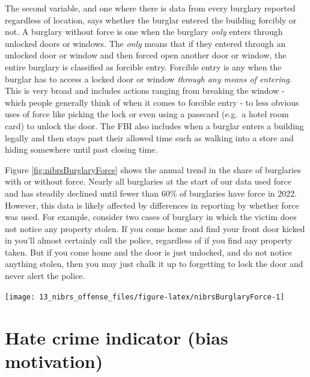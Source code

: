 \documentclass[
]{krantz}
\let\origfigure\figure
\let\endorigfigure\endfigure
\renewenvironment{figure}[1][2] {
    \expandafter\origfigure\expandafter[H]
} {
    \endorigfigure
}
\begin{document}
The second variable, and one where there is data from every
burglary reported regardless of location, says whether the
burglar entered the building forcibly or not. A burglary
without force is one when the burglary \emph{only} enters
through unlocked doors or windows. The \emph{only} means
that if they entered through an unlocked door or window and
then forced open another door or window, the entire burglary
is classified as forcible entry. Forcible entry is any when
the burglar has to access a locked door or window
\emph{through any means of entering}. This is very broad and
includes actions ranging from breaking the window - which
people generally think of when it comes to forcible entry -
to less obvious uses of force like picking the lock or even
using a passcard (e.g.~a hotel room card) to unlock the
door. The FBI also includes when a burglar enters a building
legally and then stays past their allowed time such as
walking into a store and hiding somewhere until past closing
time.

Figure \ref{fig:nibrsBurglaryForce} shows the annual trend
in the share of burglaries with or without force. Nearly all
burglaries at the start of our data used force and has
steadily declined until fewer than 60\% of burglaries have
force in 2022. However, this data is likely affected by
differences in reporting by whether force was used. For
example, consider two cases of burglary in which the victim
does not notice any property stolen. If you come home and
find your front door kicked in you'll almost certainly call
the police, regardless of if you find any property taken.
But if you come home and the door is just unlocked, and do
not notice anything stolen, then you may just chalk it up to
forgetting to lock the door and never alert the police.

\begin{figure}

{\centering \texttt{[image: 13\_nibrs\_offense\_files/figure-latex/nibrsBurglaryForce-1]} 

}

\caption{The annual percent of burglaries, by whether entry used force, 1991-2022.}\label{fig:nibrsBurglaryForce}
\end{figure}

\section{Hate crime indicator (bias
motivation)}\label{hate-crime-indicator-bias-motivation}
\end{document}
